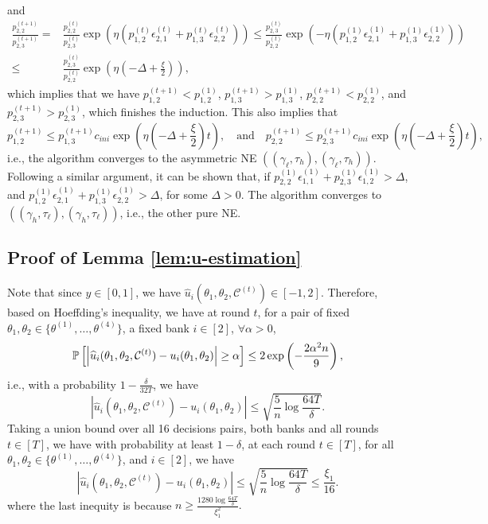 and 
\begin{equation*}
    \begin{split}
          \frac{p^{(t+1)}_{2,2}}{p^{(t+1)}_{2,3}} = {} & \frac{p^{(t)}_{2,2}}{p^{(t)}_{2,3}}\exp\left(\eta\left(p^{(t)}_{1,2}\epsilon^{(t)}_{2,1} + p^{(t)}_{1,3}\epsilon^{(t)}_{2,2}\right)\right) \leq \frac{p^{(t)}_{2,3}}{p^{(t)}_{2,2}}\exp\left(-\eta\left(p^{(1)}_{1,2}\epsilon^{(1)}_{2,1} + p^{(1)}_{1,3}\epsilon^{(1)}_{2,2}\right)\right)\\
          \leq {} & \frac{p^{(t)}_{2,3}}{p^{(t)}_{2,2}}\exp\left(\eta\left(-\Delta+\frac{\xi}{2}\right)\right),
    \end{split}
\end{equation*}
which implies that we have $p^{(t+1)}_{1,2}< p^{(1)}_{1,2}$,  $p^{(t+1)}_{1,3}> p^{(1)}_{1,3}$, $p^{(t+1)}_{2,2}<p^{(1)}_{2,2}$, and $p^{(t+1)}_{2,3}>p^{(1)}_{2,3}$, which finishes the induction. This also implies that 
\[
p^{(t+1)}_{1,2}\leq p^{(t+1)}_{1,3}c_{ini}\exp\left(\eta\left(-\Delta+\frac{\xi}{2}\right)t\right), \quad \text{and} \quad p^{(t+1)}_{2,2}\leq p^{(t+1)}_{2,3}c_{ini}\exp\left(\eta\left(-\Delta+\frac{\xi}{2}\right)t\right),
\]
i.e., the algorithm converges to the asymmetric NE $((\gamma_{\ell},\tau_{h}),(\gamma_{\ell},\tau_{h}))$. Following a similar argument, it can be shown that, if $p^{(1)}_{2,2}\epsilon^{(1)}_{1,1}+p^{(1)}_{2,3}\epsilon^{(1)}_{1,2}>\Delta$, and $p^{(1)}_{1,2}\epsilon^{(1)}_{2,1}+p^{(1)}_{1,3}\epsilon^{(1)}_{2,2}>\Delta$, for some $\Delta>0$.  The algorithm converges to $((\gamma_{h},\tau_{\ell}),(\gamma_{h},\tau_{\ell}))$, i.e., the other pure NE. \\

\subsection{Proof of Lemma \ref{lem:u-estimation}}
\label{Proof of u-estimation}
Note that since $y\in[0,1]$, we have $\widehat{u}_i(\theta_1, \theta_2, \mathcal{C}^{(t)})\in[-1,2]$. Therefore, based on Hoeffding's inequality, we have at round $t$, for a pair of fixed $\theta_1,\theta_2\in\{\theta^{(1)},\dots,\theta^{(4)}\}$, a fixed bank $i\in[2]$, $\forall \alpha>0$, 
$$ \P\left[\left|\widehat{u}_i(\theta_1, \theta_2, \mathcal{C}^{(t)})-{u}_i(\theta_1, \theta_2)\right|\geq \alpha\right] \leq 2\exp\left(-\frac{2\alpha^2n}{9}\right), $$
i.e., with a probability $1-\frac{\delta}{32T}$, we have 
$$ \left|\widehat{u}_i(\theta_1, \theta_2, \mathcal{C}^{(t)})-{u}_i(\theta_1, \theta_2)\right|\leq \sqrt{\frac{5}{n}\log\frac{64T}{\delta}}. $$
Taking a union bound over all 16 decisions pairs, both banks and all rounds $t\in[T]$, we have with probability at least  $1-\delta$, at each round $t\in[T]$, for all $\theta_1,\theta_2\in\{\theta^{(1)},\dots,\theta^{(4)}\}$, and $i\in[2]$, we have 
$$ \left|\widehat{u}_i(\theta_1, \theta_2, \mathcal{C}^{(t)})-{u}_i(\theta_1, \theta_2)\right|\leq \sqrt{\frac{5}{n}\log\frac{64T}{\delta}}\leq \frac{\xi_1}{16}. $$
where the last inequity is because $n\geq \frac{1280\log\frac{64T}{\delta}}{\xi_1^2}.$ 


